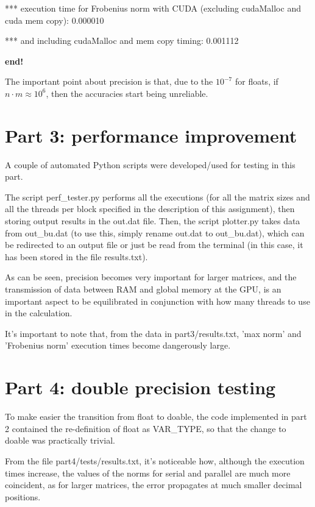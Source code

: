 \documentclass[paper=a4, fontsize=11pt]{scrartcl} %
\numberwithin{equation}{section} %
\numberwithin{figure}{section} %
\numberwithin{table}{section} %
\begin{document}
*** execution time for Frobenius norm with CUDA (excluding cudaMalloc and cuda mem copy): 0.000010

*** and including cudaMalloc and mem copy timing: 0.001112

\textbf{end!}

The important point about precision is that, due to the $10^{-7}$ for floats, if $n\cdot m \approx 10^6$, then the accuracies start being unreliable.

\section{Part 3: performance improvement}

A couple of automated Python scripts were developed/used for testing in this part.

The script perf\_tester.py performs all the executions (for all the matrix sizes and all the threads per block specified in the description of this assignment), then storing output results in the out.dat file. Then, the script plotter.py takes data from out\_bu.dat (to use this, simply rename out.dat to out\_bu.dat), which can be redirected to an output file or just be read from the terminal (in this case, it has been stored in the file results.txt).

As can be seen, precision becomes very important for larger matrices, and the transmission of data between RAM and global memory at the GPU, is an important aspect to be equilibrated in conjunction with how many threads to use in the calculation.

It's important to note that, from the data in part3/results.txt, 'max norm' and 'Frobenius norm' execution times become dangerously large.


\section{Part 4: double precision testing}

To make easier the transition from float to doable, the code implemented in part 2 contained the re-definition of float as VAR\_TYPE, so that the change to doable was practically trivial.

From the file part4/tests/results.txt, it's noticeable how, although the execution times increase, the values of the norms for serial and parallel are much more coincident, as for larger matrices, the error propagates at much smaller decimal positions.
\end{document}

